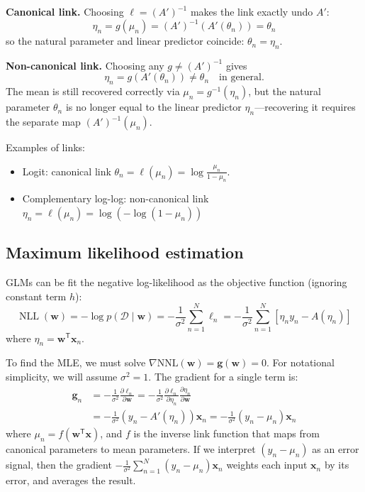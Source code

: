 \documentclass[11pt]{article}
\begin{document}
\textbf{Canonical link.} Choosing $\ell = (A')^{-1}$ makes the link exactly undo $A'$:
$$
\eta_n = g(\mu_n) = (A')^{-1}(A'(\theta_n)) = \theta_n
$$
so the natural parameter and linear predictor coincide: $\theta_n = \eta_n$.

\textbf{Non-canonical link.} Choosing any $g \ne (A')^{-1}$ gives
$$
\eta_n = g(A'(\theta_n)) \ne \theta_n \quad \text{in general.}
$$
The mean is still recovered correctly via $\mu_n = g^{-1}(\eta_n)$, but the natural parameter $\theta_n$ is no longer equal to the linear predictor $\eta_n$---recovering it requires the separate map $(A')^{-1}(\mu_n)$.

Examples of links:
\begin{itemize}
    \item Logit: canonical link $\theta_n = \ell(\mu_n) = \log\frac{\mu_n}{1-\mu_n}$.
    \item Complementary log-log: non-canonical link $\eta_n = \ell(\mu_n) = \log(-\log(1-\mu_n))$
\end{itemize}

\subsection{Maximum likelihood estimation}

GLMs can be fit the negative log-likelihood as the objective function (ignoring constant term $h$):
\[
\operatorname{NLL}(\boldsymbol{w})
= -\log p(\mathcal{D} \mid \boldsymbol{w})
= -\frac{1}{\sigma^2}\sum_{n=1}^{N}\ell_n 
= -\frac{1}{\sigma^2}\sum_{n=1}^{N}[\eta_n y_n - A(\eta_n)]
\]
where $\eta_n = \boldsymbol{w}^{\mathsf{T}}\boldsymbol{x}_n$. 

To find the MLE, we must solve $\nabla \text{NNL}(\boldsymbol{w}) = \boldsymbol{g(w)} = 0$. For notational simplicity, we will assume $\sigma^2 = 1$. The gradient for a single term is:
\[
\begin{aligned}
\boldsymbol{g}_n &= 
-\frac{1}{\sigma^2}\frac{\partial \ell_n}{\partial \boldsymbol{w}}
=-\frac{1}{\sigma^2} \frac{\partial \ell_n}{\partial \eta_n}\frac{\partial \eta_n}{\partial \boldsymbol{w}} \\
&=-\frac{1}{\sigma^2} \left(y_n - A'(\eta_n)\right)\boldsymbol{x}_n
=-\frac{1}{\sigma^2} (y_n - \mu_n)\boldsymbol{x}_n
\end{aligned}
\]
where $\mu_n = f(\boldsymbol{w^{\mathsf{T}} x})$, and $f$ is the inverse link function that maps from canonical parameters to mean parameters. If we interpret $(y_n - \mu_n)$ as an error signal, then the gradient $-\frac{1}{\sigma^2}\sum_{n=1}^{N}(y_n - \mu_n)\boldsymbol{x}_n$ weights each input $\boldsymbol{x}_n$ by its error, and averages the result.
\end{document}

